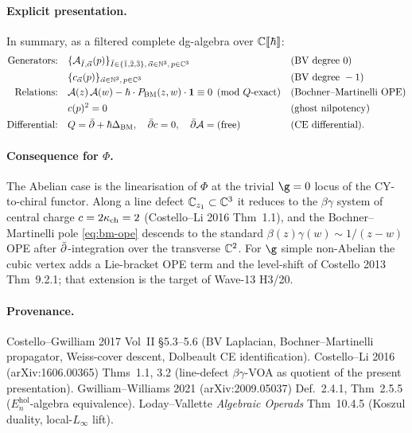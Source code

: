 \paragraph{Explicit presentation.}
In summary, as a filtered complete dg-algebra over $\mathbb{C}\llbracket \hbar \rrbracket$:
\begin{align*}
  \text{Generators:} \quad
  & \{\mathcal{A}_{\bar{I}, \vec{\alpha}}(p)\}_{\bar{I} \in \{\bar{1},\bar{2},\bar{3}\},\,
      \vec{\alpha} \in \mathbb{N}^3,\, p \in \mathbb{C}^3}
    && \text{(BV degree } 0\text{)} \\
  & \{c_{\vec{\alpha}}(p)\}_{\vec{\alpha} \in \mathbb{N}^3,\, p \in \mathbb{C}^3}
    && \text{(BV degree } -1\text{)} \\
  \text{Relations:} \quad
  & \mathcal{A}(z) \, \mathcal{A}(w) - \hbar \cdot P_{\mathrm{BM}}(z, w)\cdot \mathbf{1}
    \equiv 0 \pmod{Q\text{-exact}}
    && \text{(Bochner--Martinelli OPE)} \\
  & c(p)^2 = 0
    && \text{(ghost nilpotency)} \\
  \text{Differential:} \quad
  & Q = \bar{\partial} + \hbar \Delta_{\mathrm{BM}},
    \quad \bar{\partial} c = 0, \quad \bar{\partial} \mathcal{A} = (\text{free})
    && \text{(CE differential)}.
\end{align*}

\paragraph{Consequence for $\Phi$.}
The Abelian case is the linearisation of $\Phi$ at the trivial
$\g = 0$ locus of the CY-to-chiral functor. Along a line defect
$\mathbb{C}_{z_1} \subset \mathbb{C}^3$ it reduces to the $\beta\gamma$ system of
central charge $c = 2\kappa_{\mathrm{ch}} = 2$ (Costello--Li 2016 Thm~1.1), and the
Bochner--Martinelli pole \eqref{eq:bm-ope} descends to the standard
$\beta(z)\gamma(w) \sim 1/(z - w)$ OPE after $\bar{\partial}$-integration over
the transverse $\mathbb{C}^2$. For $\g$ simple non-Abelian the cubic vertex
adds a Lie-bracket OPE term and the level-shift of Costello 2013
Thm~9.2.1; that extension is the target of Wave-13 H3/20.

\paragraph{Provenance.}
Costello--Gwilliam 2017 Vol~II \S5.3--5.6 (BV Laplacian, Bochner--Martinelli
propagator, Weiss-cover descent, Dolbeault CE identification). Costello--Li
2016 (arXiv:1606.00365) Thms~1.1, 3.2 (line-defect $\beta\gamma$-VOA as
quotient of the present presentation). Gwilliam--Williams 2021
(arXiv:2009.05037) Def.~2.4.1, Thm~2.5.5 ($E_n^{\mathrm{hol}}$-algebra
equivalence). Loday--Vallette \emph{Algebraic Operads} Thm~10.4.5 (Koszul
duality, local-$L_\infty$ lift).
